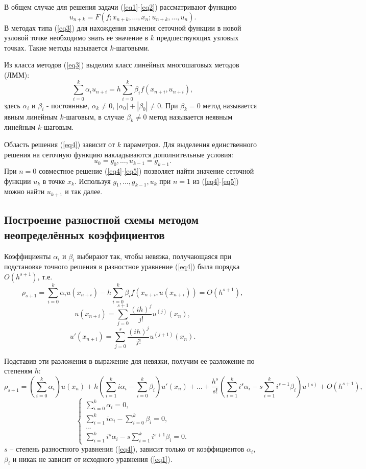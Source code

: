 \documentclass[
11pt,
master, %
subf, %
href, %
colorlinks=true, %
times, %
]{disser}
\begin{document}
В общем случае для решения задачи (\ref{eq1}-\ref{eq2}) рассматривают функцию
\begin{equation}\label{eq3}
  u_{n+k} = F(f;x_{n+k},\ldots,x_n;u_{n+k},\ldots,u_n).
\end{equation}
В методах типа (\ref{eq3}) для нахождения значения сеточной функции в новой узловой точке необходимо знать ее значение в $k$ предшествующих узловых точках. Такие методы называется $k$-шаговыми.

Из класса методов (\ref{eq3}) выделим класс линейных многошаговых методов (ЛММ):
\begin{equation}\label{eq4}
  \sum_{i=0}^{k} \alpha_i u_{n+i} = h\sum_{i=0}^{k}\beta_i f(x_{n+i}, u_{n+i}),
\end{equation}
здесь $\alpha_i$ и $\beta_i$ - постоянные, $\alpha_k \neq 0$, $|\alpha_0| + |\beta_0| \neq 0$. При $\beta_k = 0$ метод называется явным линейным $k$-шаговым, в случае $\beta_k \neq 0$ метод называется неявным линейным $k$-шаговым.

Область решения (\ref{eq4}) зависит от $k$ параметров. Для выделения единственного решения на сеточную функцию накладываются дополнительные условия:
\begin{equation}\label{eq5}
  u_0 = g_0,\ldots,u_{k-1} = g_{k-1}.
\end{equation}
При $n=0$ совместное решение (\ref{eq4}-\ref{eq5}) позволяет найти значение сеточной функции $u_k$ в точке $x_k$. Используя $g_1,\ldots,g_{k-1}, u_k$ при $n=1$ из (\ref{eq4}-\ref{eq5}) можно найти $u_{k+1}$ и так далее.

\subsection{Построение разностной схемы методом неопределённых коэффициентов}
Коэффициенты $\alpha_i$ и $\beta_i$ выбирают так, чтобы невязка, получающаяся при подстановке точного решения в разностное уравнение (\ref{eq4}) была порядка $O(h^{s+1})$, т.е.
$$\rho_{s+1} = \sum_{i=0}^{k} \alpha_i u(x_{n+i}) - h \sum_{i=0}^{k} \beta_i f(x_{n+i},u(x_{n+i})) = O(h^{s+1}),$$
$$u(x_{n+i}) = \sum_{j=0}^{s+1} \frac{(i h)^j}{j!} u^{(j)}(x_n),$$
$$u'(x_{n+i}) = \sum_{j=0}^{s} \frac{(i h)^j}{j!} u^{(j+1)}(x_n).$$

Подставив эти разложения в выражение для невязки, получим ее разложение по степеням $h$:
$$\rho_{s+1} = \left(\sum_{i=0}^{k} \alpha_i\right) u(x_{n}) + h \left(\sum_{i=1}^{k} i\alpha_i - \sum_{i=0}^{k} \beta_i\right)u'(x_n) + \ldots + \frac{h^s}{s!}\left(\sum_{i=1}^{k} i^s \alpha_i - s\sum_{i=1}^{k}i^{s-1}\beta_i\right)u^{(s)} + O(h^{s+1}),$$
$$
\left\{
  \begin{array}{ll}
    \sum_{i=0}^{k} \alpha_i = 0,\\
    \sum_{i=1}^{k} i\alpha_i - \sum_{i=0}^{k}\beta_i = 0,\\
    \ldots\\
    \sum_{i=1}^{k} i^s \alpha_i - s\sum_{i=1}^{k} i^{s+1}\beta_i = 0.
  \end{array}
\right.
$$
$s$ -- степень разностного уравнения (\ref{eq4}), зависит только от коэффициентов $\alpha_i$, $\beta_i$ и никак не зависит от исходного уравнения (\ref{eq1}).
\end{document}
